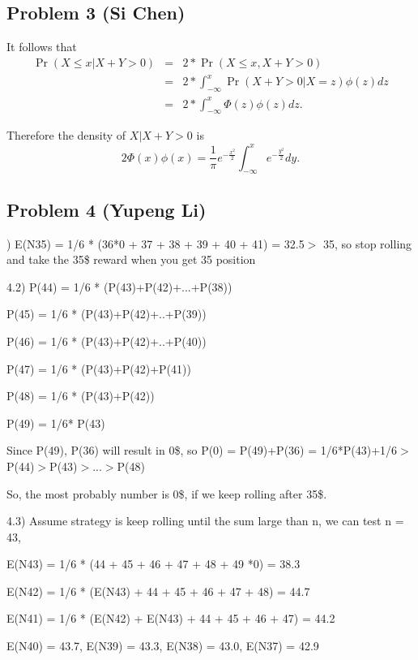 \documentclass[10pt]{article}
\begin{document}
\subsection*{Problem 3 (Si Chen)}
It follows that
\begin{eqnarray*}\;\text{Pr}\;(X \leq x\vert X +Y >0) &  = & 2 \ast \;\text{Pr}\;(X \leq x ,X +Y >0) \\
&  = & 2 \ast \int _{ -\infty }^{x}\;\text{Pr}\;(X +Y >0\vert X =z)\phi  (z)  dz \\
&  = & 2 \ast \int _{ -\infty }^{x}\Phi  (z) \phi  (z)  dz\text{.}\end{eqnarray*}

Therefore the density of $X\vert X +Y >0$ is 
\begin{equation*}2 \Phi  (x) \phi  (x) =\frac{1}{\pi } e^{ -\frac{x^{2}}{2}} \int _{ -\infty }^{x}e^{ -\frac{y^{2}}{2}}  dy\text{.}
\end{equation*}

\subsection*{Problem 4 (Yupeng Li)}
) E(N35) = 1/6 * (36*0 + 37 + 38 + 39 + 40 + 41) = 32.5$ >$ 35, so stop rolling and take the 35\$ reward when you get 35 position

4.2) P(44) = 1/6 * (P(43)+P(42)+...+P(38))

\qquad P(45) = 1/6 * (P(43)+P(42)+..+P(39))

\qquad P(46) = 1/6 * (P(43)+P(42)+..+P(40))

\qquad P(47) = 1/6 * (P(43)+P(42)+P(41))

\qquad P(48) = 1/6 * (P(43)+P(42))

\qquad P(49) = 1/6* P(43)

\qquad Since P(49), P(36) will result in 0\$, so P(0) = P(49)+P(36) = 1/6*P(43)+1/6$ >$ P(44)$ >$P(43)$ >$...$ >$P(48)

\qquad So, the most probably number is 0\$, if we keep rolling after 35\$.

4.3) Assume strategy is keep rolling until the sum large than n, we can test n = 43,

\qquad E(N43) =  1/6 * (44 + 45 + 46 + 47 + 48 + 49 *0) = 38.3

\qquad E(N42) =  1/6 * (E(N43) + 44 + 45 + 46 + 47 + 48) = 44.7

\qquad E(N41) =  1/6 * (E(N42) + E(N43) + 44 + 45 + 46 + 47) = 44.2

\qquad E(N40) =  43.7, E(N39) =  43.3, E(N38) =  43.0, E(N37) =  42.9
\end{document}
